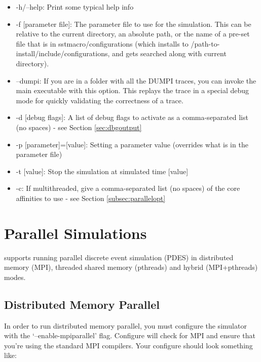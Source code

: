 \begin{itemize}
\item -h/--help: Print some typical help info
\item -f [parameter file]: The parameter file to use for the simulation.  
This can be relative to the current directory, an absolute path, or the name of a pre-set file that is in sstmacro/configurations 
(which installs to /path-to-install/include/configurations, and gets searched along with current directory). 
\item --dumpi: If you are in a folder with all the DUMPI traces, you can invoke the main  executable with this option.  This replays the trace in a special debug mode for quickly validating the correctness of a trace.
\item -d [debug flags]: A list of debug flags to activate as a comma-separated list (no spaces) - see Section \ref{sec:dbgoutput}
\item -p [parameter]=[value]: Setting a parameter value (overrides what is in the parameter file)
\item -t [value]: Stop the simulation at simulated time [value]
\item -c: If multithreaded, give a comma-separated list (no spaces) of the core affinities to use - see Section \ref{subsec:parallelopt}
\end{itemize}

\section{Parallel Simulations}
\label{sec:PDES}

\sstmacro supports running parallel discrete event simulation (PDES) in distributed memory (MPI), threaded shared memory (pthreads) and hybrid (MPI+pthreads) modes.  

\subsection{Distributed Memory Parallel}
\label{subsec:mpiparallel}
In order to run distributed memory parallel, you must configure the simulator with the `--enable-mpiparallel' flag.
Configure will check for MPI and ensure that you're using
the standard MPI compilers.  Your configure should look something like:


